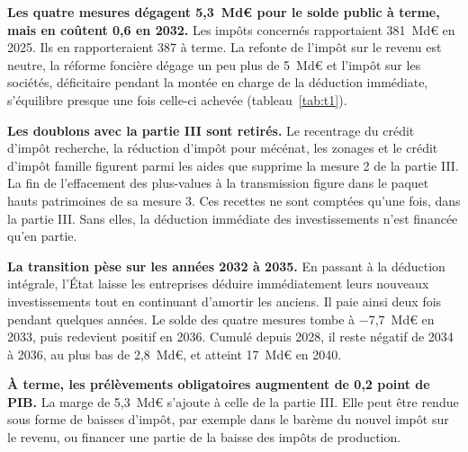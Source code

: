 \textbf{Les quatre mesures dégagent 5,3~Md€ pour le solde public à terme, mais en coûtent 0,6 en 2032.} Les impôts
concernés rapportaient 381~Md€ en 2025. Ils en rapporteraient 387 à terme. La refonte de l'impôt sur le revenu est
neutre, la réforme foncière dégage un peu plus de 5~Md€ et l'impôt sur les sociétés, déficitaire pendant la montée en
charge de la déduction immédiate, s'équilibre presque une fois celle-ci achevée (tableau~\ref{tab:t1}).



\textbf{Les doublons avec la partie III sont retirés.} Le recentrage du crédit d'impôt recherche, la réduction d'impôt
pour mécénat, les zonages et le crédit d'impôt famille figurent parmi les aides que supprime la mesure 2 de la partie III.
La fin de l'effacement des plus-values à la transmission figure dans le paquet hauts patrimoines de sa mesure 3. Ces
recettes ne sont comptées qu'une fois, dans la partie III. Sans elles, la déduction immédiate des investissements n'est
financée qu'en partie.

\textbf{La transition pèse sur les années 2032 à 2035.} En passant à la déduction intégrale, l'État laisse les
entreprises déduire immédiatement leurs nouveaux investissements tout en continuant d'amortir les anciens. Il paie
ainsi deux fois pendant quelques années. Le solde des quatre mesures tombe à $-$7,7~Md€ en 2033, puis redevient positif
en 2036. Cumulé depuis 2028, il reste négatif de 2034 à 2036, au plus bas de 2,8~Md€, et atteint 17~Md€ en 2040.


\BILANIR

\textbf{À terme, les prélèvements obligatoires augmentent de 0,2 point de PIB.} La marge de 5,3~Md€ s'ajoute à celle
de la partie III. Elle peut être rendue sous forme de baisses d'impôt, par exemple dans le barème du nouvel impôt sur le
revenu, ou financer une partie de la baisse des impôts de production.

